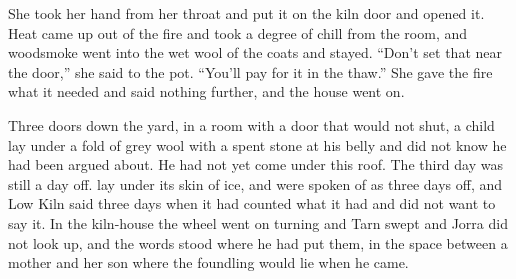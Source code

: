 She took her hand from her throat and put it on the kiln door and opened it. Heat came up out of the fire and took a degree of chill from the room, and woodsmoke went into the wet wool of the coats and stayed. “Don't set that near the door,” she said to the pot. “You'll pay for it in the thaw.” She gave the fire what it needed and said nothing further, and the house went on.

Three doors down the yard, in a room with a door that would not shut, a child lay under a fold of grey wool with a spent stone at his belly and did not know he had been argued about. He had not yet come under this roof. The third day was still a day off.  lay under its skin of ice, and  were spoken of as three days off, and Low Kiln said three days when it had counted what it had and did not want to say it. In the kiln-house the wheel went on turning and Tarn swept and Jorra did not look up, and the words stood where he had put them, in the space between a mother and her son where the foundling would lie when he came.
